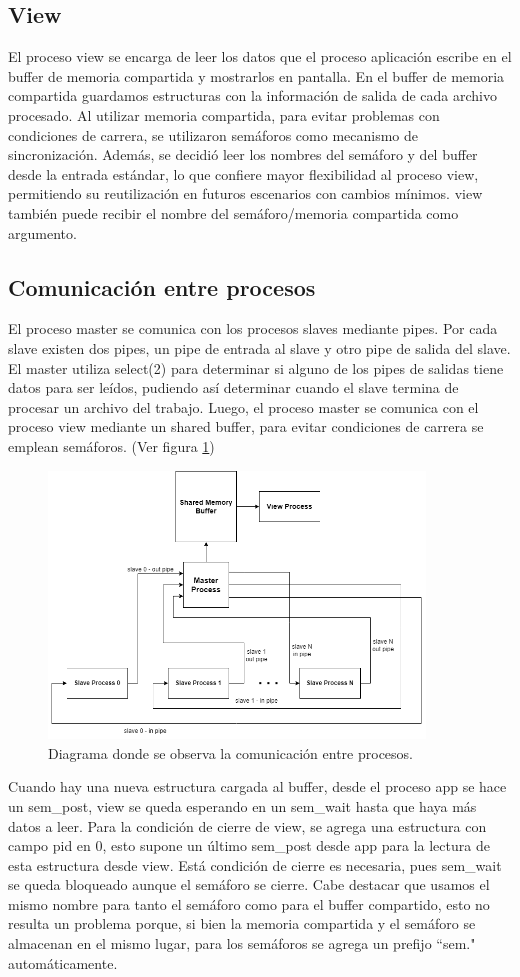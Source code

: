 \documentclass{article}
\begin{document}
\subsection{View}
El proceso view se encarga de leer los datos que el proceso aplicación escribe en el buffer de memoria compartida y mostrarlos en pantalla. En el buffer de memoria compartida guardamos estructuras con la información de salida de cada archivo procesado. Al utilizar memoria compartida, para evitar problemas con condiciones de carrera, se utilizaron semáforos como mecanismo de sincronización.
Además, se decidió leer los nombres del semáforo y del buffer desde la entrada estándar, lo que confiere mayor flexibilidad al proceso view, permitiendo su reutilización en futuros escenarios con cambios mínimos. view también puede recibir el nombre del semáforo/memoria compartida como argumento.
\subsection{Comunicación entre procesos}
El proceso master se comunica con los procesos slaves mediante pipes. Por cada slave existen dos pipes, un pipe de entrada al slave y otro pipe de salida del slave. El master utiliza select(2) para determinar si alguno de los pipes de salidas tiene datos para ser leídos, pudiendo así determinar cuando el slave termina de procesar un archivo del trabajo. Luego, el proceso master se comunica con el proceso view mediante un shared buffer, para evitar condiciones de carrera se emplean semáforos. (Ver figura \ref{fig:diagramaComunicacion})
\begin{figure}[H]
\begin{center}
\includegraphics[width=100mm]{diagramaComunicacion}
\caption{Diagrama donde se observa la comunicación entre procesos.}
\label{fig:diagramaComunicacion}
\end{center}
\end{figure}
Cuando hay una nueva estructura cargada al buffer, desde el proceso app se hace un sem\_post, view se queda esperando en un sem\_wait hasta que haya más datos a leer. Para la condición de cierre de view, se agrega una estructura con campo pid en 0, esto supone un último sem\_post desde app para la lectura de esta estructura desde view. Está condición de cierre es necesaria, pues sem\_wait se queda bloqueado aunque el semáforo se cierre.
Cabe destacar que usamos el mismo nombre para tanto el semáforo como para el buffer compartido, esto no resulta un problema porque, si bien la memoria compartida y el semáforo se almacenan en el mismo lugar, para los semáforos se agrega un prefijo ``sem." automáticamente.
\end{document}
